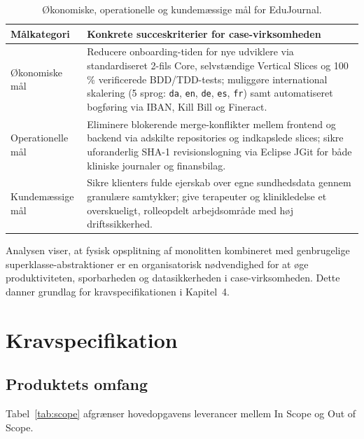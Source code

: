 \documentclass[11pt,a4paper]{article}
\begin{document}
\begin{table}[htbp]
\begin{table}[htbp]
\centering
\small
\begin{tabularx}{\textwidth}{P{3.4cm} Y}
\toprule
\textbf{Målkategori} & \textbf{Konkrete succeskriterier for case-virksomheden} \\
\midrule
Økonomiske mål & Reducere onboarding-tiden for nye udviklere via standardiseret 2-fils Core, selvstændige Vertical Slices og 100\,\% verificerede BDD/TDD-tests; muliggøre international skalering (5 sprog: \texttt{da}, \texttt{en}, \texttt{de}, \texttt{es}, \texttt{fr}) samt automatiseret bogføring via IBAN, Kill Bill og Fineract. \\
\addlinespace
Operationelle mål & Eliminere blokerende merge-konflikter mellem frontend og backend via adskilte repositories og indkapslede slices; sikre uforanderlig SHA-1 revisionslogning via Eclipse JGit for både kliniske journaler og finansbilag. \\
\addlinespace
Kundemæssige mål & Sikre klienters fulde ejerskab over egne sundhedsdata gennem granulære samtykker; give terapeuter og klinikledelse et overskueligt, rolleopdelt arbejdsområde med høj driftssikkerhed. \\
\bottomrule
\end{tabularx}
\caption{Økonomiske, operationelle og kundemæssige mål for EduJournal.}
\label{tab:forretningsmaal}
\end{table}

Analysen viser, at fysisk opsplitning af monolitten kombineret med genbrugelige superklasse-abstraktioner er en organisatorisk nødvendighed for at øge produktiviteten, sporbarheden og datasikkerheden i case-virksomheden. Dette danner grundlag for kravspecifikationen i Kapitel~4.

\section{Kravspecifikation}

\subsection{Produktets omfang}
Tabel~\ref{tab:scope} afgrænser hovedopgavens leverancer mellem In Scope og Out of Scope.


\end{table}
\end{document}
